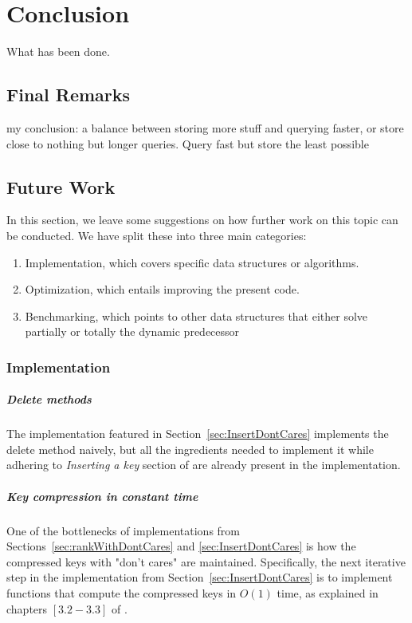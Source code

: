 \chapter{Conclusion}

What has been done.

\section{Final Remarks}

my conclusion: a balance between storing more stuff and querying faster, or store close to nothing but longer queries. Query fast but store the least possible

\section{Future Work}
In this section, we leave some suggestions on how further work on this topic can be conducted. We have split these into three main categories:
\begin{enumerate}
    \item
    Implementation, which covers specific data structures or algorithms.
    
    \item
    Optimization, which entails improving the present code.
    
    \item
    Benchmarking, which points to other data structures that either solve partially or totally the dynamic predecessor 
    
\end{enumerate}

\subsection{Implementation} \label{sec:FutureWorkImplementation}

\paragraph*{Delete methods}
The implementation featured in Section~\ref{sec:InsertDontCares} implements the {\ttfamily delete} method naively, but all the ingredients needed to implement it while adhering to \textit{Inserting a key} section of \cite{patrascu2014dynamic} are already present in the implementation.

\paragraph*{Key compression in constant time}
One of the bottlenecks of implementations from Sections~\ref{sec:rankWithDontCares} and \ref{sec:InsertDontCares} is how the compressed keys with "don't cares" are maintained. Specifically, the next iterative step in the implementation from Section~\ref{sec:InsertDontCares} is to implement functions that compute the compressed keys in $O(1)$ time, as explained in chapters $[3.2 - 3.3]$ of \cite{patrascu2014dynamic}.

